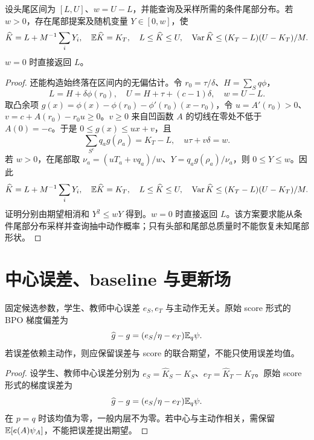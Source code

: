 \begin{theorem}[确定区间内的无偏中心估计]
设头尾区间为 $[L,U]$、$w=U-L$，并能查询及采样所需的条件尾部分布。若 $w>0$，存在尾部提案及随机变量 $Y\in[0,w]$，使
\begin{equation}
\widehat K=L+M^{-1}\sum_iY_i,\quad
\mathbb E\widehat K=K_T,\quad L\le\widehat K\le U,\quad
\operatorname{Var}\widehat K\le(K_T-L)(U-K_T)/M.
\end{equation}
$w=0$ 时直接返回 $L$。
\end{theorem}
\begin{proof}
还能构造始终落在区间内的无偏估计。令 $r_0=\tau/\delta$、$H=\sum_Sq\phi$，
\begin{equation}
L=H+\delta\phi(r_0),\quad U=H+\tau+(c-1)\delta,\quad w=U-L.
\end{equation}
取凸余项 $g(x)=\phi(x)-\phi(r_0)-\phi'(r_0)(x-r_0)$，令 $u=A'(r_0)>0$、$v=c+A(r_0)-r_0u\ge0$。$v\ge0$ 来自凹函数 $A$ 的切线在零处不低于 $A(0)=-c$。于是 $0\le g(x)\le ux+v$，且
\begin{equation}
\sum_{S^c}q_ag(\rho_a)=K_T-L,\quad u\tau+v\delta=w.
\end{equation}
若 $w>0$，在尾部取 $\nu_a=(uT_a+vq_a)/w$、$Y=q_ag(\rho_a)/\nu_a$，则 $0\le Y\le w$。因此
\begin{equation}
\widehat K=L+M^{-1}\sum_iY_i,\quad
\mathbb E\widehat K=K_T,\quad L\le\widehat K\le U,\quad
\operatorname{Var}\widehat K\le(K_T-L)(U-K_T)/M.
\end{equation}
证明分别由期望相消和 $Y^2\le wY$ 得到。$w=0$ 时直接返回 $L$。该方案要求能从条件尾部分布采样并查询抽中动作概率；只有头部和尾部总质量时不能恢复未知尾部形状。
\end{proof}

\section{中心误差、baseline 与更新场}
\begin{proposition}
固定候选参数，学生、教师中心误差 $e_S,e_T$ 与主动作无关。原始 score 形式的 BPO 梯度偏差为
\begin{equation}
\widehat g-g=(e_S/\eta-e_T)\mathbb E_q\psi.
\end{equation}
若误差依赖主动作，则应保留误差与 score 的联合期望，不能只使用误差均值。
\end{proposition}
\begin{proof}
设学生、教师中心误差分别为 $e_S=\widehat K_S-K_S$、$e_T=\widehat K_T-K_T$。原始 score 形式的梯度误差为
\begin{equation}
\widehat g-g=(e_S/\eta-e_T)\mathbb E_q\psi.
\label{eq:center-gradient-bias}
\end{equation}
在 $p=q$ 时该均值为零，一般内层不为零。若中心与主动作相关，需保留 $\mathbb E[e(A)\psi_A]$，不能把误差提出期望。
\end{proof}

